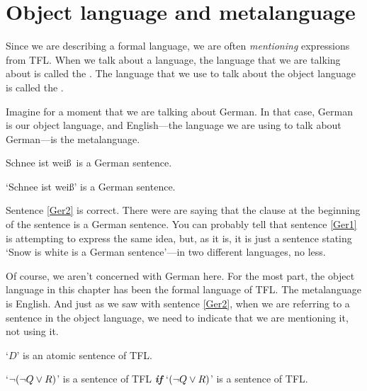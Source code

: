 

\section{Object language and metalanguage}\label{s:Metalanguage}
Since we are describing a formal language, we are often \emph{mentioning} expressions from TFL. When we talk about a language, the language that we are talking about is called the . The language that we use to talk about the object language is called the .\label{def.metalanguage} 

Imagine for a moment that we are talking about German. In that case, German is our object language, and English---the language we are using to talk about German---is the metalanguage.
	\begin{earg}
		\item[\ex{Ger1}] Schnee ist wei\ss\ is a German sentence.
		\item[\ex{Ger2}]`Schnee ist wei\ss' is a German sentence.
	\end{earg}
Sentence \ref{Ger2} is correct. There were are saying that the clause at the beginning of the sentence is a German sentence. You can probably tell that sentence \ref{Ger1} is attempting to express the same idea, but, as it is, it is just a sentence stating `Snow is white is a German sentence'---in two different languages, no less. 

Of course, we aren't concerned with German here. For the most part, the object language in this chapter has been the formal language of TFL. The metalanguage is English. And just as we saw with sentence \ref{Ger2}, when we are referring to a sentence in the object language, we need to indicate that we are mentioning it, not using it. 
	\begin{earg}
		\item[\ex{obj1}] `$D$' is an atomic sentence of TFL.
		\item[\ex{obj2}] `${\neg} ({\neg} Q \vee R)$' is a sentence of TFL \textit{\textbf{if}} `$({\neg} Q \vee R)$' is a sentence of TFL.
	\end{earg}

